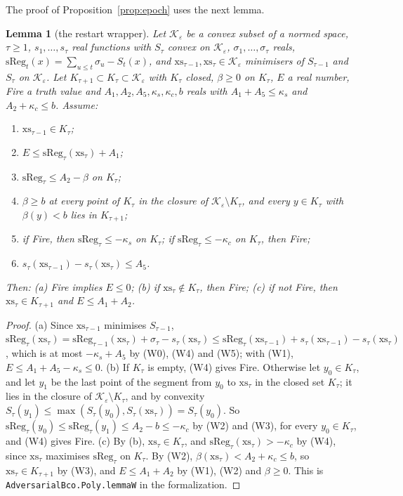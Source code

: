\documentclass[11pt]{amsart}
\newtheorem{lemma}[theorem]{Lemma}
\theoremstyle{definition}
\numberwithin{equation}{section}
\newcommand{\cK}{\mathcal{K}}
\begin{document}
The proof of Proposition~\ref{prop:epoch} uses the next lemma.

\begin{lemma}[the restart wrapper]\label{lem:w}
Let $\cK_\varepsilon$ be a convex subset of a normed space, $\tau\ge1$, $s_1,\dots,s_\tau$ real functions with $S_\tau$ convex on $\cK_\varepsilon$, $\sigma_1,\dots,\sigma_\tau$ reals, $\mathrm{sReg}_t(x)=\sum_{u\le t}\sigma_u-S_t(x)$, and $\mathrm{xs}_{\tau-1},\mathrm{xs}_\tau\in\cK_\varepsilon$ minimisers of $S_{\tau-1}$ and $S_\tau$ on $\cK_\varepsilon$. Let $K_{\tau+1}\subset K_\tau\subset\cK_\varepsilon$ with $K_\tau$ closed, $\beta\ge0$ on $K_\tau$, $E$ a real number, Fire a truth value and $A_1,A_2,A_5,\kappa_s,\kappa_c,b$ reals with $A_1+A_5\le\kappa_s$ and $A_2+\kappa_c\le b$. Assume:
\begin{enumerate}[label=(W\arabic*),start=0]
\item $\mathrm{xs}_{\tau-1}\in K_\tau$;
\item $E\le\mathrm{sReg}_\tau(\mathrm{xs}_\tau)+A_1$;
\item $\mathrm{sReg}_\tau\le A_2-\beta$ on $K_\tau$;
\item $\beta\ge b$ at every point of $K_\tau$ in the closure of $\cK_\varepsilon\setminus K_\tau$, and every $y\in K_\tau$ with $\beta(y)<b$ lies in $K_{\tau+1}$;
\item if Fire, then $\mathrm{sReg}_\tau\le-\kappa_s$ on $K_\tau$; if $\mathrm{sReg}_\tau\le-\kappa_c$ on $K_\tau$, then Fire;
\item $s_\tau(\mathrm{xs}_{\tau-1})-s_\tau(\mathrm{xs}_\tau)\le A_5$.
\end{enumerate}
Then: (a) Fire implies $E\le0$; (b) if $\mathrm{xs}_\tau\notin K_\tau$, then Fire; (c) if not Fire, then $\mathrm{xs}_\tau\in K_{\tau+1}$ and $E\le A_1+A_2$.
\end{lemma}

\begin{proof}
(a) Since $\mathrm{xs}_{\tau-1}$ minimises $S_{\tau-1}$, $\mathrm{sReg}_\tau(\mathrm{xs}_\tau)=\mathrm{sReg}_{\tau-1}(\mathrm{xs}_\tau)+\sigma_\tau-s_\tau(\mathrm{xs}_\tau)\le\mathrm{sReg}_\tau(\mathrm{xs}_{\tau-1})+s_\tau(\mathrm{xs}_{\tau-1})-s_\tau(\mathrm{xs}_\tau)$, which is at most $-\kappa_s+A_5$ by (W0), (W4) and (W5); with (W1), $E\le A_1+A_5-\kappa_s\le0$. (b) If $K_\tau$ is empty, (W4) gives Fire. Otherwise let $y_0\in K_\tau$, and let $y_1$ be the last point of the segment from $y_0$ to $\mathrm{xs}_\tau$ in the closed set $K_\tau$; it lies in the closure of $\cK_\varepsilon\setminus K_\tau$, and by convexity $S_\tau(y_1)\le\max(S_\tau(y_0),S_\tau(\mathrm{xs}_\tau))=S_\tau(y_0)$. So $\mathrm{sReg}_\tau(y_0)\le\mathrm{sReg}_\tau(y_1)\le A_2-b\le-\kappa_c$ by (W2) and (W3), for every $y_0\in K_\tau$, and (W4) gives Fire. (c) By (b), $\mathrm{xs}_\tau\in K_\tau$, and $\mathrm{sReg}_\tau(\mathrm{xs}_\tau)>-\kappa_c$ by (W4), since $\mathrm{xs}_\tau$ maximises $\mathrm{sReg}_\tau$ on $K_\tau$. By (W2), $\beta(\mathrm{xs}_\tau)<A_2+\kappa_c\le b$, so $\mathrm{xs}_\tau\in K_{\tau+1}$ by (W3), and $E\le A_1+A_2$ by (W1), (W2) and $\beta\ge0$.
This is \texttt{AdversarialBco.Poly.lemmaW} in the formalization.
\end{proof}
\end{document}

